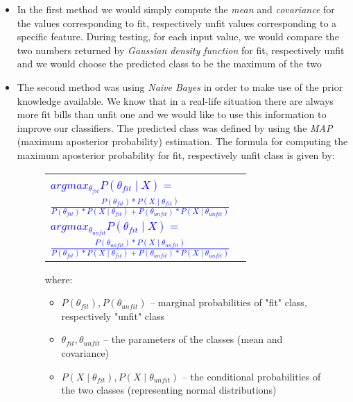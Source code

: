 \documentclass[11pt,twocolumn]{article}
\begin{document}
\begin{itemize}
\item In the first method we would simply compute the \emph{mean} and \emph{covariance} for the values corresponding to fit, respectively unfit values corresponding to a specific feature. During testing, for each input value, we would compare the two numbers returned by \emph{Gaussian density function} for fit, respectively unfit and we would choose the predicted class to be the maximum of the two  
\item The second method was using \emph{Naive Bayes} in order to make use of the prior knowledge available. We know that in a real-life situation there are always more fit bills than unfit one and we would like to use this information to improve our classifiers. The predicted class was defined by using the \emph{MAP} (maximum aposterior probability) estimation. The formula for computing the maximum aposterior probability for fit, respectively unfit class is given by:
\begin{figure}[!hbtp]
	\selectfont\small
	\begin{tabular}{|lr|} \hline
		&\\[5pt]
		\textcolor{blue}{$argmax_{\theta_{fit}}P(\theta_{fit}\mid X) = $} &\\[3pt]
		\hspace*{70px}\textcolor{blue}{$\frac{P(\theta_{fit})*P(X\mid \theta_{fit})}{P(\theta_{fit})*P(X\mid \theta_{fit}) + P(\theta_{unfit})*P(X\mid \theta_{unfit})}$} &\\[10pt]
		\textcolor{blue}{$argmax_{\theta_{unfit}}P(\theta_{fit}\mid X) = $} &\\[3pt]
		\hspace*{70px}\textcolor{blue}{$\frac{P(\theta_{unfit})*P(X\mid \theta_{unfit})}{P(\theta_{fit})*P(X\mid \theta_{fit}) + P(\theta_{unfit})*P(X\mid \theta_{unfit})}$} &\\[10pt]
\hline
\end{tabular}
		where: 
		\begin{itemize}
		\item $P(\theta_{fit}), P(\theta_{unfit})$ -- marginal probabilities of "fit" class, respectively "unfit" class 
		\item $\theta_{fit}, \theta_{unfit}$ -- the parameters of the classes (mean and covariance) 
		\item $P(X\mid \theta_{fit}),P(X\mid \theta_{unfit})$ -- the conditional probabilities of the two classes (representing normal distributions) 
		\end{itemize} 
\end{figure}


\end{itemize}
\end{document}
